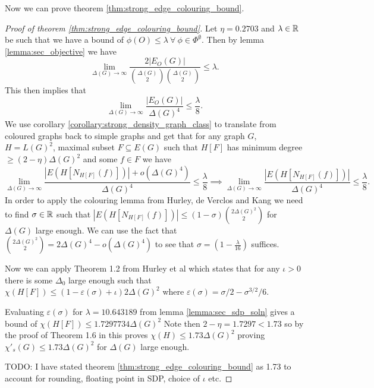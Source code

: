 Now we can prove theorem \ref{thm:strong_edge_colouring_bound}.
\begin{proof}[Proof of theorem \ref{thm:strong_edge_colouring_bound}]
    Let $\eta = 0.2703$ and $\lambda\in\mathbb{R}$ be such that we have a bound of
    $\phi(O) \leq \lambda\ \forall\ \phi\in\Phi^\emptyset$.
    Then by lemma \ref{lemma:sec_objective} we have
    \[
        \lim_{\Delta(G) \to \infty}
        \frac{2|E_O(G)|}{\binom{\Delta(G)}{2}\binom{\Delta(G)}{2}}
        \leq \lambda.
    \]
    This then implies that
    \[
        \lim_{\Delta(G) \to \infty}
        \frac{|E_O(G)|}{\Delta(G)^4}
        \leq \frac{\lambda}{8}.
    \]
    We use corollary \ref{corollary:strong_density_graph_class} to translate from
    coloured graphs back to simple graphs and get that for any graph $G$,
    $H = L(G)^2$, maximal subset $F\subseteq E(G)$ such that $H[F]$ has minimum degree
    $\geq (2-\eta)\Delta(G)^2$ and some $f\in F$ we have
    \[
        \lim_{\Delta(G) \to \infty}
        \frac{|E(H[N_{H[F]}(f)])| + o(\Delta(G)^4)}{\Delta(G)^4}
        \leq \frac{\lambda}{8}
        \implies
        \lim_{\Delta(G) \to \infty}
        \frac{|E(H[N_{H[F]}(f)])|}{\Delta(G)^4}
        \leq \frac{\lambda}{8}.
    \]
    In order to apply the colouring lemma from Hurley, de Verclos and Kang
    \cite{hurleyImprovedProcedureColouring2022} we need to find $\sigma\in\mathbb{R}$ such that
    $|E(H[N_{H[F]}(f)])| \leq (1-\sigma)\binom{2\Delta(G)^2}{2}$ for $\Delta(G)$ large
    enough. We can use the fact that
    $\binom{2\Delta(G)^2}{2} = 2\Delta(G)^4 - o(\Delta(G)^4)$
    to see that $\sigma = (1-\frac{\lambda}{16})$ suffices.

    Now we can apply Theorem 1.2 from Hurley et al \cite{hurleyImprovedProcedureColouring2022}
    which states that for any $\iota > 0$ there is some $\Delta_0$ large enough such that
    $\chi(H[F]) \leq (1-\varepsilon(\sigma) + \iota)2\Delta(G)^2$
    where $\varepsilon(\sigma) = \sigma/2 - \sigma^{3/2}/6$.

    Evaluating $\varepsilon(\sigma)$ for $\lambda = 10.643189$ from 
    lemma \ref{lemma:sec_sdp_soln} gives a bound of
    $\chi(H[F]) \leq 1.7297734\Delta(G)^2$
    Note then $2-\eta = 1.7297 < 1.73$ so by the proof of Theorem 1.6 in
    \cite{hurleyImprovedProcedureColouring2022}
    this proves $\chi(H) \leq 1.73\Delta(G)^2$ proving
    $\chi'_s(G) \leq 1.73\Delta(G)^2$ for $\Delta(G)$ large enough.

    TODO: I have stated theorem \ref{thm:strong_edge_colouring_bound} as 1.73 to account
    for rounding, floating point in SDP, choice of $\iota$ etc.
\end{proof}
